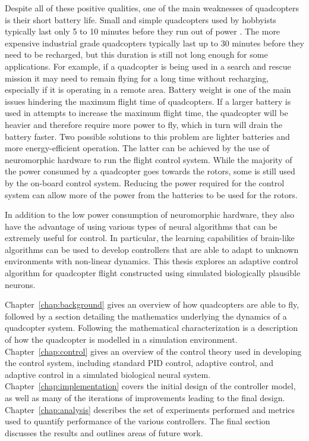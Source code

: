 \documentclass[letterpaper,12pt,titlepage,oneside,final]{book}
\newcommand{\Chapref}[1]{Chapter~\ref{#1}}
\begin{document}
Despite all of these positive qualities, one of the main weaknesses of quadcopters is their short battery life. 
Small and simple quadcopters used by hobbyists typically last only 5 to 10 minutes before they run out of power \cite{batterylife}. 
The more expensive industrial grade quadcopters typically last up to 30 minutes before they need to be recharged, but this duration is still not long enough for some applications. 
For example, if a quadcopter is being used in a search and rescue mission it may need to remain flying for a long time without recharging, especially if it is operating in a remote area. 
Battery weight is one of the main issues hindering the maximum flight time of quadcopters. 
If a larger battery is used in attempts to increase the maximum flight time, the quadcopter will be heavier and therefore require more power to fly, which in turn will drain the battery faster. 
Two possible solutions to this problem are lighter batteries and more energy-efficient operation.
The latter can be achieved by the use of neuromorphic hardware to run the flight control system.
While the majority of the power consumed by a quadcopter goes towards the rotors, some is still used by the on-board control system.
Reducing the power required for the control system can allow more of the power from the batteries to be used for the rotors.

In addition to the low power consumption of neuromorphic hardware, they also have the advantage of using various types of neural algorithms that can be extremely useful for control.
In particular, the learning capabilities of brain-like algorithms can be used to develop controllers that are able to adapt to unknown environments with non-linear dynamics. 
This thesis explores an adaptive control algorithm for quadcopter flight constructed using simulated biologically plausible neurons.

\Chapref{chap:background} gives an overview of how quadcopters are able to fly, followed by a section detailing the mathematics underlying the dynamics of a quadcopter system. 
Following the mathematical characterization is a description of how the quadcopter is modelled in a simulation environment.
\Chapref{chap:control} gives an overview of the control theory used in developing the control system, including standard PID control, adaptive control, and adaptive control in a simulated biological neural system. 
\Chapref{chap:implementation} covers the initial design of the controller model, as well as many of the iterations of improvements leading to the final design.
\Chapref{chap:analysis} describes the set of experiments performed and metrics used to quantify performance of the various controllers. 
The final section discusses the results and outlines areas of future work.
\end{document}
